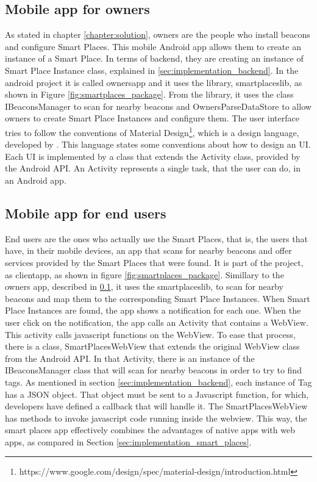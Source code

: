 \subsection{Mobile app for owners}
\label{sub:implementation_mobile_app_for_owners}
As stated in chapter \ref{chapter:solution}, owners are the people who install beacons and configure Smart Places. This mobile Android app allows them to create an instance of a Smart Place.
In terms of backend, they are creating an instance of Smart Place Instance class, explained in \ref{sec:implementation_backend}.
In the android project it is called ownersapp and it uses the library, smartplaceslib, as shown in Figure \ref{fig:smartplaces_package}.
From the library, it uses the class IBeaconsManager to scan for nearby beacons and OwnersParseDataStore to allow owners to create Smart Place Instances and configure them.
The user interface tries to follow the conventions of Material Design\footnote{https://www.google.com/design/spec/material-design/introduction.html}, which is a design language, developed by .
This language states some conventions about how to design an \gls{UI}.
Each \gls{UI} is implemented by a class that extends the Activity class, provided by the Android \gls{API}.
An Activity represents a single task, that the user can do, in an Android app.

\subsection{Mobile app for end users}
\label{sub:implementation_mobile_app_for_end_users}
End users are the ones who actually use the Smart Places, that is, the users that have, in their mobile devices, an app that scans for nearby beacons and offer services provided by the Smart Places that were found.
It is part of the project, as clientapp, as shown in figure \ref{fig:smartplaces_package}. Simillary to the owners app, described in \ref{sub:implementation_mobile_app_for_owners}, it uses the smartplaceslib, to scan for nearby beacons and map them to the corresponding Smart Place Instances.
When Smart Place Instances are found, the app shows a notification for each one.
When the user click on the notification, the app calls an Activity that contains a WebView. This activity calls javascript functions on the WebView.
To ease that process, there is a class, SmartPlacesWebView that extends the original WebView class from the Android \gls{API}.
In that Activity, there is an instance of the IBeaconsManager class that will scan for nearby beacons in order to try to find tags. As mentioned in section \ref{sec:implementation_backend},
each instance of Tag has a \gls{JSON} object. That object must be sent to a Javascript function, for which, developers have defined a callback that will handle it. The SmartPlacesWebView has methods to invoke javascript code running inside the webview.
This way, the smart places app effectively combines the advantages of native apps with web apps, as compared in Section \ref{sec:implementation_smart_places}.

